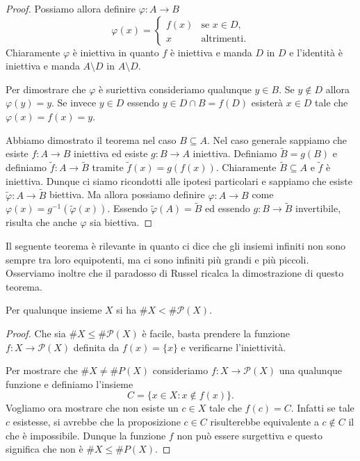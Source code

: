 \documentclass[italian,a4paper,twosides,headinclude]{scrbook}
\renewcommand{\phi}{\varphi}
\renewcommand{\subset}{\subseteq}
\renewcommand{\P}{\mathcal P}
\begin{document}
\begin{proof}

Possiamo allora definire $\phi \colon A \to B$
\[
\phi(x) =
\begin{cases}
   f(x) & \text{se $x\in D$}, \\
   x & \text{altrimenti.}
\end{cases}
\]
Chiaramente $\phi$ è iniettiva in quanto $f$ è iniettiva e manda $D$ in $D$
e l'identità è iniettiva e manda $A\setminus D$ in $A\setminus D$.

Per dimostrare che $\phi$ è suriettiva consideriamo qualunque $y \in B$.
Se $y\not \in D$ allora $\phi(y)=y$.
Se invece $y\in D$ essendo $y\in D\cap B = f(D)$ esisterà $x\in D$ tale
che $\phi(x) = f(x) = y$.

Abbiamo dimostrato il teorema nel caso $B\subset A$.
Nel caso generale sappiamo che esiste $f\colon A\to B$ iniettiva
ed esiste $g\colon B\to A$ iniettiva. Definiamo $\tilde B=g(B)$ e
definiamo $\tilde f\colon A\to \tilde B$ tramite $\tilde f(x) = g(f(x))$.
Chiaramente $\tilde B\subset A$ e $\tilde f$ è iniettiva.
Dunque ci siamo ricondotti alle ipotesi particolari e sappiamo che esiste
$\tilde \phi \colon A \to \tilde B$ biettiva. Ma allora possiamo definire
$\phi\colon A\to B$ come $\phi(x) = g^{-1}(\tilde \phi(x))$.
Essendo $\tilde \phi(A)=\tilde B$ ed essendo $g\colon B\to \tilde B$
invertibile, risulta che anche $\phi$ sia biettiva.
\end{proof}


Il seguente teorema è rilevante in quanto ci dice che gli insiemi infiniti
non sono sempre tra loro equipotenti, ma ci sono infiniti più grandi e più piccoli.
Osserviamo inoltre che il paradosso di Russel
ricalca la dimostrazione di questo teorema.

\begin{theorem}[Cantor]
Per qualunque insieme $X$ si ha $\# X < \# \P(X)$.
\end{theorem}
%
\begin{proof}
Che sia $\#X\le \#\P(X)$ è facile, basta prendere la funzione
$f\colon X\to \P(X)$ definita da $f(x) = \{x\}$ e verificarne
l'iniettività.

Per mostrare che $\# X \neq \#P(X)$ consideriamo
$f\colon X \to \P(X)$ una qualunque funzione
e definiamo l'insieme
\[
   C = \{x \in X \colon x \not \in f(x) \}.
\]
Vogliamo ora mostrare che non esiste un $c\in X$ tale che $f(c) = C$.
Infatti se tale $c$ esistesse, si avrebbe che la proposizione
$c\in C$ risulterebbe equivalente a $c\not \in C$ il che è impossibile.
Dunque la funzione $f$ non può essere surgettiva e questo significa che
non è $\#X \le \#P(X)$.
\end{proof}
\end{document}
